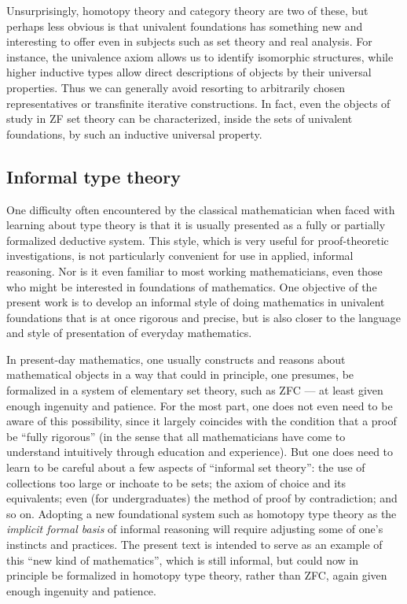 Unsurprisingly, homotopy theory and category theory are two of these, but perhaps less obvious is that univalent foundations has something new and interesting to offer even in subjects such as set theory and real analysis.
For instance, the univalence axiom allows us to identify isomorphic structures, while higher inductive types allow direct descriptions of objects by their universal properties.
Thus we can generally avoid resorting to arbitrarily chosen representatives or transfinite iterative constructions.
In fact, even the objects of study in ZF set theory can be characterized, inside the sets of univalent foundations, by such an inductive universal property.

%


\subsection*{Informal type theory}

%
%
%
%
One difficulty often encountered by the classical mathematician when faced with learning about type theory is that it is usually presented as a fully or partially formalized deductive system.
This style, which is very useful for proof-theoretic investigations, is not particularly convenient for use in applied, informal reasoning.
Nor is it even familiar to most working mathematicians, even those who might be interested in foundations of mathematics.
One objective of the present work is to develop an informal style of doing mathematics in univalent foundations that is at once rigorous and precise, but is also closer to the language and style of presentation of everyday mathematics.

In present-day mathematics, one usually constructs and reasons about mathematical objects in a way that could in principle, one presumes, be formalized in a system of elementary set theory, such as ZFC --- at least given enough ingenuity and patience.
For the most part, one does not even need to be aware of this possibility, since it largely coincides with the condition that a proof be ``fully rigorous'' (in the sense that all mathematicians have come to understand intuitively through education and experience).
But one does need to learn to be careful about a few aspects of ``informal set theory'': the use of collections too large or inchoate to be sets; the axiom of choice and its equivalents; even (for undergraduates) the method of proof by contradiction; and so on.
Adopting a new foundational system such as homotopy type theory as the \emph{implicit formal basis} of informal reasoning will require adjusting some of one's instincts and practices.
The present text is intended to serve as an example of this ``new kind of mathematics'', which is still informal, but could now in principle be formalized in homotopy type theory, rather than ZFC, again given enough ingenuity and patience.


